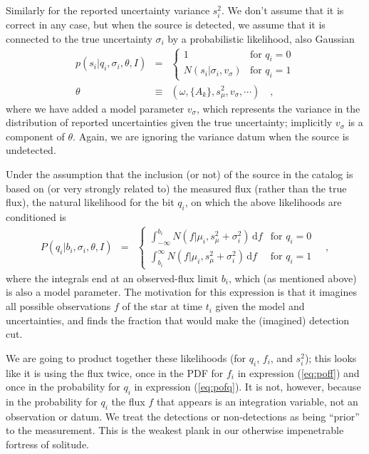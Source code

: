 \documentclass[12pt,preprint]{aastex}
\newcommand{\dd}{\mathrm{d}}
\begin{document}
Similarly for the reported uncertainty variance $s_i^2$.  We don't
assume that it is correct in any case, but when the source is
detected, we assume that it is connected to the true uncertainty
$\sigma_i$ by a probabilistic likelihood, also Gaussian
\begin{eqnarray}\displaystyle
p(s_i|q_i,\sigma_i,\theta,I) &=& \left\{\begin{array}{ll}
  1 & \mbox{for $q_i=0$} \\
  N(s_i|\sigma_i,v_\sigma) & \mbox{for $q_i=1$}
\end{array}\right.
\\
\theta &\equiv& (\omega, \{A_k\}, s_\mu^2, v_\sigma, \cdots)
\quad ,
\end{eqnarray}
where we have added a model parameter $v_\sigma$, which represents the
variance in the distribution of reported uncertainties given the true
uncertainty; implicitly $v_\sigma$ is a component of $\theta$.  Again,
we are ignoring the variance datum when the source is undetected.

Under the assumption that the inclusion (or not) of the source in the
catalog is based on (or very strongly related to) the measured flux
(rather than the true flux), the natural likelihood for the bit $q_i$,
on which the above likelihoods are conditioned is
\begin{eqnarray}\displaystyle
P(q_i|b_i,\sigma_i,\theta,I) &=& \left\{\begin{array}{ll}
  \displaystyle\int_{-\infty}^{b_i} N(f|\mu_i,s_\mu^2+\sigma_i^2)\,\dd f & \mbox{for $q_i=0$} \\
  \displaystyle\int_{b_i}^\infty N(f|\mu_i,s_\mu^2+\sigma_i^2)\,\dd f & \mbox{for $q_i=1$}
\end{array}\right.\label{eq:pofq}
\quad,
\end{eqnarray}
where the integrals end at an observed-flux limit $b_i$, which (as
mentioned above) is also a model parameter.  The motivation for this
expression is that it imagines all possible observations $f$ of the
star at time $t_i$ given the model and uncertainties, and finds the
fraction that would make the (imagined) detection cut.

We are going to product together these likelihoods (for $q_i$, $f_i$,
and $s_i^2$); this looks like it is using the flux twice, once in the
PDF for $f_i$ in expression (\ref{eq:poff}) and once in the
probability for $q_i$ in expression (\ref{eq:pofq}).  It is not,
however, because in the probability for $q_i$ the flux $f$ that
appears is an integration variable, not an observation or datum.  We
treat the detections or non-detections as being ``prior'' to the
measurement.  This is the weakest plank in our otherwise impenetrable
fortress of solitude.
\end{document}
